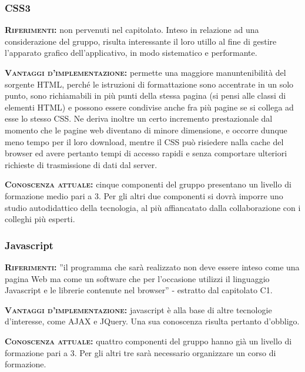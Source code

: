 \subsubsection{CSS3}
\begin{description}
	\item{\scshape\bfseries Riferimenti:} non pervenuti nel capitolato. Inteso in relazione ad una considerazione del gruppo, risulta interessante il loro utillo al fine di gestire l'apparato grafico dell'applicativo, in modo sistematico e performante.
	
\item{\scshape\bfseries Vantaggi d'implementazione:} permette una maggiore manuntenibilità del sorgente HTML, perché le istruzioni di formattazione sono accentrate in un solo punto, sono richiamabili in più punti della stessa pagina (si pensi alle classi di elementi HTML) e possono essere condivise anche fra più pagine se si collega ad esse lo stesso CSS\@. Ne deriva inoltre un certo incremento prestazionale dal momento che le pagine web diventano di minore dimensione, e occorre dunque meno tempo per il loro download, mentre il CSS può risiedere nalla cache del browser ed avere pertanto tempi di accesso rapidi e senza comportare ulteriori richieste di trasmissione di dati dal server.
	
	\item{\scshape\bfseries Conoscenza attuale:} cinque componenti del gruppo presentano un livello di formazione medio pari a 3. Per gli altri due componenti si dovrà imporre uno studio autodidattico della tecnologia, al più affiancatato dalla collaborazione con i colleghi più esperti.
\end{description}

\subsubsection{Javascript}
\begin{description} 
	\item{\scshape\bfseries Riferimenti:}
  ''il programma che sarà realizzato non deve essere inteso come una pagina Web ma come un software che per l'occasione utilizzi il linguaggio Javascript e le librerie contenute nel browser'' - estratto dal capitolato C1.

	\item{\scshape\bfseries Vantaggi d'implementazione:} javascript è alla base di altre tecnologie d'interesse, come AJAX e JQuery. Una sua conoscenza risulta pertanto d'obbligo.

	\item{\scshape\bfseries Conoscenza attuale:} quattro componenti del gruppo hanno già un livello di formazione pari a 3. Per gli altri tre sarà necessario organizzare un corso di formazione.
\end{description}

